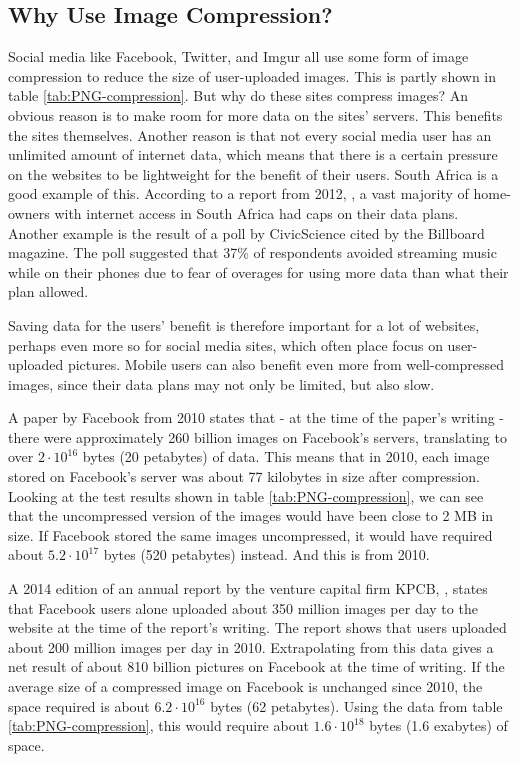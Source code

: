 \subsection{Why Use Image Compression?}
\label{sec:whycompression}
Social media like Facebook, Twitter, and Imgur all use some form of image compression to reduce the size of user-uploaded images.
This is partly shown in table \ref{tab:PNG-compression}.
But why do these sites compress images?
An obvious reason is to make room for more data on the sites' servers.
This benefits the sites themselves.
Another reason is that not every social media user has an unlimited amount of internet data, which means that there is a certain pressure on the websites to be lightweight for the benefit of their users.
South Africa is a good example of this.
According to a report from 2012, \citep{chetty_2012}, a vast majority of home-owners with internet access in South Africa had caps on their data plans.
Another example is the result of a poll by CivicScience \citep{tmobilemusic} cited by the Billboard magazine.
The poll suggested that 37\% of respondents avoided streaming music while on their phones due to fear of overages for using more data than what their plan allowed.

Saving data for the users' benefit is therefore important for a lot of websites, perhaps even more so for social media sites, which often place focus on user-uploaded pictures.
Mobile users can also benefit even more from well-compressed images, since their data plans may not only be limited, but also slow.

A paper by Facebook from 2010 \citep{beaver2010} states that - at the time of the paper's writing - there were approximately 260 billion images on Facebook's servers, translating to over $2\cdot10^{16}$ bytes (20 petabytes) of data.
This means that in 2010, each image stored on Facebook's server was about 77 kilobytes in size after compression.
Looking at the test results shown in table \ref{tab:PNG-compression}, we can see that the uncompressed version of the images would have been close to 2 MB in size.
If Facebook stored the same images uncompressed, it would have required about $5.2\cdot10^{17}$ bytes (520 petabytes) instead.
And this is from 2010.

A 2014 edition of an annual report by the venture capital firm KPCB, \citep{meeker2014internet}, states that Facebook users alone uploaded about
350 million images per day to the website at the time of the report's writing.
The report shows that users uploaded about 200 million images per day in 2010.
Extrapolating from this data gives a net result of about 810 billion pictures on Facebook at the time of writing.
If the average size of a compressed image on Facebook is unchanged since 2010, the space required is about $6.2\cdot10^{16}$ bytes (62 petabytes).
Using the data from table \ref{tab:PNG-compression}, this would require about $1.6\cdot10^{18}$ bytes (1.6 exabytes) of space.

